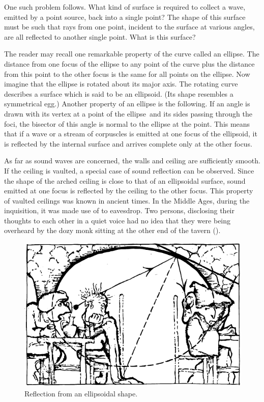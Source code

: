 One such problem follows. What kind of surface is required to collect a wave, emitted by a point source, back into a single point? The shape of this surface must be such that rays from one point, incident to the surface at various angles, are all reflected to another single point. What is this surface?

The reader may recall one remarkable property of the curve called an ellipse. The distance from one focus of the ellipse to any point of the curve plus the distance from this point to the other focus is the same for all points on the ellipse. Now imagine that the ellipse is rotated about its major axis. The rotating curve describes a surface which is said to be an ellipsoid. (Its shape resembles a symmetrical egg.) Another property of an ellipse is the following. If an angle is drawn with its vertex at a point of the ellipse~and its sides passing through the foci, the bisector of this angle is normal to the ellipse at the point. This means that if a wave or a stream of corpuscles is emitted at one focus of the ellipsoid, it is reflected by the internal surface and arrives complete only at the other focus.

As far as sound waves are concerned, the walls and ceiling are sufficiently smooth. If the ceiling is vaulted, a special case of sound reflection can be observed. Since the shape of the arched ceiling is close to that of an ellipsoidal surface, sound emitted at one focus is reflected by the ceiling to the other focus. This property of vaulted ceilings was known in ancient times. In the Middle Ages, during the inquisition, it was made use of to eavesdrop. Two persons, disclosing their thoughts to each other in a quiet voice had no idea that they were being overheard by the dozy monk sitting at the other end of the tavern ().

\begin{figure}[!ht]
\centering
\includegraphics[width=\textwidth]{figures/fig-05-02.pdf}
\caption{Reflection from an ellipsoidal shape.}
\label{fig-5.2}
\end{figure}

